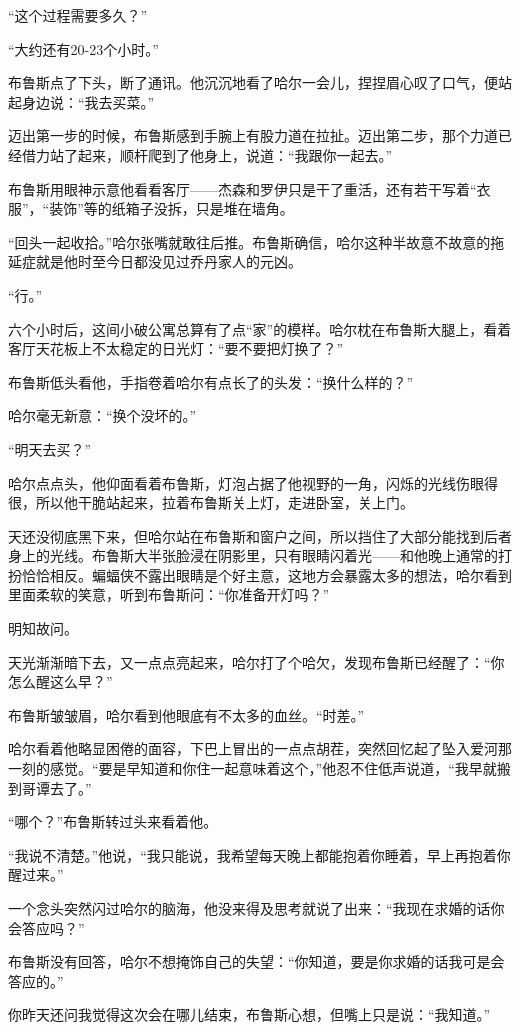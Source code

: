 \documentclass[../main]{subfiles}
\begin{document}
“这个过程需要多久？”

“大约还有20-23个小时。”

布鲁斯点了下头，断了通讯。他沉沉地看了哈尔一会儿，捏捏眉心叹了口气，便站起身边说：“我去买菜。”

迈出第一步的时候，布鲁斯感到手腕上有股力道在拉扯。迈出第二步，那个力道已经借力站了起来，顺杆爬到了他身上，说道：“我跟你一起去。”

布鲁斯用眼神示意他看看客厅——杰森和罗伊只是干了重活，还有若干写着“衣服”，“装饰”等的纸箱子没拆，只是堆在墙角。

“回头一起收拾。”哈尔张嘴就敢往后推。布鲁斯确信，哈尔这种半故意不故意的拖延症就是他时至今日都没见过乔丹家人的元凶。

“行。”

六个小时后，这间小破公寓总算有了点“家”的模样。哈尔枕在布鲁斯大腿上，看着客厅天花板上不太稳定的日光灯：“要不要把灯换了？”

布鲁斯低头看他，手指卷着哈尔有点长了的头发：“换什么样的？”

哈尔毫无新意：“换个没坏的。”

“明天去买？”

哈尔点点头，他仰面看着布鲁斯，灯泡占据了他视野的一角，闪烁的光线伤眼得很，所以他干脆站起来，拉着布鲁斯关上灯，走进卧室，关上门。

天还没彻底黑下来，但哈尔站在布鲁斯和窗户之间，所以挡住了大部分能找到后者身上的光线。布鲁斯大半张脸浸在阴影里，只有眼睛闪着光——和他晚上通常的打扮恰恰相反。蝙蝠侠不露出眼睛是个好主意，这地方会暴露太多的想法，哈尔看到里面柔软的笑意，听到布鲁斯问：“你准备开灯吗？”

明知故问。

天光渐渐暗下去，又一点点亮起来，哈尔打了个哈欠，发现布鲁斯已经醒了：“你怎么醒这么早？”

布鲁斯皱皱眉，哈尔看到他眼底有不太多的血丝。“时差。”

哈尔看着他略显困倦的面容，下巴上冒出的一点点胡茬，突然回忆起了坠入爱河那一刻的感觉。“要是早知道和你住一起意味着这个，”他忍不住低声说道，“我早就搬到哥谭去了。”

“哪个？”布鲁斯转过头来看着他。

“我说不清楚。”他说，“我只能说，我希望每天晚上都能抱着你睡着，早上再抱着你醒过来。”

一个念头突然闪过哈尔的脑海，他没来得及思考就说了出来：“我现在求婚的话你会答应吗？”

布鲁斯没有回答，哈尔不想掩饰自己的失望：“你知道，要是你求婚的话我可是会答应的。”

你昨天还问我觉得这次会在哪儿结束，布鲁斯心想，但嘴上只是说：“我知道。”
\end{document}
